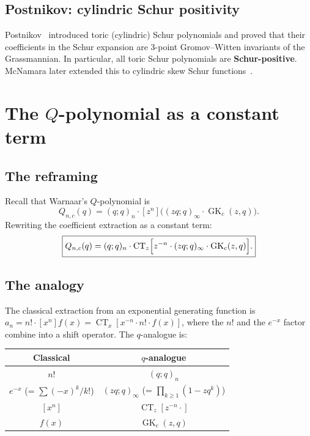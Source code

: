 \documentclass[11pt]{article}
\newcommand{\GK}{\operatorname{GK}}
\newcommand{\CT}{\operatorname{CT}}
\newcommand{\qpoch}[2]{(#1;#2)_\infty}
\begin{document}
\subsection{Postnikov: cylindric Schur positivity}

Postnikov~\cite{postnikov-2005} introduced toric (cylindric)
Schur polynomials and proved that their coefficients in the
Schur expansion are 3-point Gromov--Witten invariants of the
Grassmannian. In particular, all toric Schur polynomials are
\textbf{Schur-positive}. McNamara later extended this to
cylindric skew Schur functions~\cite{mcnamara-2019}.

\section{The $Q$-polynomial as a constant term}
\label{sec:Q-CT}

\subsection{The reframing}

Recall that Warnaar's $Q$-polynomial is
\begin{equation}\label{eq:Q-def}
  Q_{n,c}(q)
  = (q;q)_n \cdot [z^n]\bigl(\qpoch{zq}{q} \cdot \GK_c(z,q)\bigr).
\end{equation}
Rewriting the coefficient extraction as a constant term:
\begin{equation}\label{eq:Q-CT}
  \boxed{
  Q_{n,c}(q)
  = (q;q)_n \cdot
    \CT_z\Bigl[z^{-n} \cdot \qpoch{zq}{q} \cdot \GK_c(z,q)\Bigr].
  }
\end{equation}

\subsection{The analogy}

The classical extraction from an exponential generating function
is $a_n = n! \cdot [x^n] f(x) = \CT_x[x^{-n} \cdot n! \cdot
f(x)]$, where the $n!$ and the $e^{-x}$ factor combine into a
shift operator. The $q$-analogue is:
\begin{center}
\begin{tabular}{c|c}
  \textbf{Classical} & \textbf{$q$-analogue} \\
  \hline
  $n!$ & $(q;q)_n$ \\
  $e^{-x}$ (= $\sum (-x)^k/k!$) & $\qpoch{zq}{q}$
    (= $\prod_{k \geq 1}(1 - zq^k)$) \\
  $[x^n]$ & $\CT_z[z^{-n} \cdot]$ \\
  $f(x)$ & $\GK_c(z,q)$
\end{tabular}
\end{center}
\end{document}
